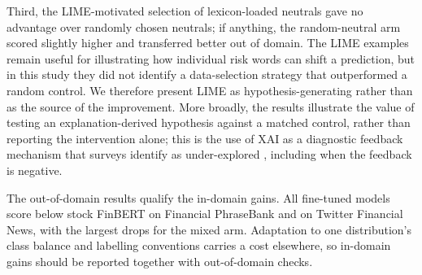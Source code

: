 \documentclass{aims}
\numberwithin{equation}{section}
\begin{document}
Third, the LIME-motivated selection of lexicon-loaded neutrals gave no advantage over
randomly chosen neutrals; if anything, the random-neutral arm scored slightly higher
and transferred better out of domain. The LIME examples remain useful for
illustrating how individual risk words can shift a prediction, but in this study
they did not identify a data-selection strategy that outperformed a random control.
We therefore present LIME as hypothesis-generating rather than as the source of the
improvement. More broadly, the results illustrate the value of testing an
explanation-derived hypothesis against a matched control, rather than reporting the
intervention alone; this is the use of XAI as a diagnostic feedback mechanism that
surveys identify as under-explored \citep{yeo2025}, including when the feedback is
negative.

The out-of-domain results qualify the in-domain gains. All fine-tuned models score
below stock FinBERT on Financial PhraseBank and on Twitter Financial News, with the
largest drops for the mixed arm. Adaptation to one distribution's class balance and
labelling conventions carries a cost elsewhere, so in-domain gains should be
reported together with out-of-domain checks.
\end{document}
